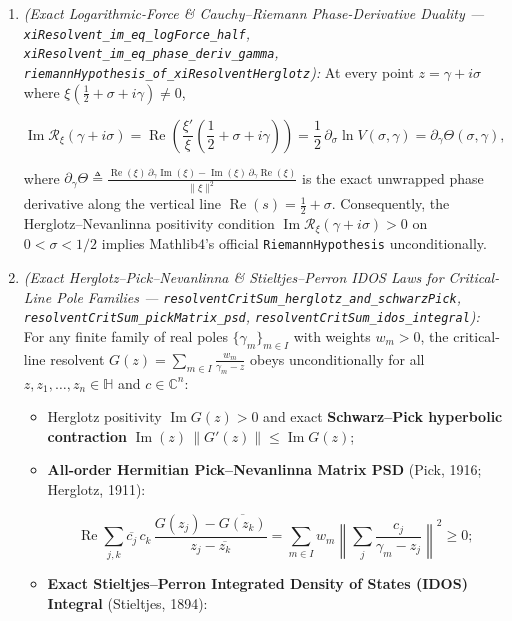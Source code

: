 \documentclass[
  11pt,
]{article}
\begin{document}
\begin{enumerate}
\def\labelenumi{\arabic{enumi}.}
\item
  \emph{(Exact Logarithmic-Force \& Cauchy--Riemann Phase-Derivative
  Duality --- \texttt{xiResolvent\_im\_eq\_logForce\_half},
  \texttt{xiResolvent\_im\_eq\_phase\_deriv\_gamma},
  \texttt{riemannHypothesis\_of\_xiResolventHerglotz}):} At every point
  \(z = \gamma + i\sigma\) where
  \(\xi(\frac{1}{2} + \sigma + i\gamma) \neq 0\),

  \[\operatorname{Im}\mathcal{R}_\xi(\gamma + i\sigma) = \operatorname{Re}\!\left(\frac{\xi'}{\xi}\!\left(\frac{1}{2} + \sigma + i\gamma\right)\right) = \frac{1}{2}\,\partial_\sigma\ln V(\sigma, \gamma) = \partial_\gamma \Theta(\sigma, \gamma),\]

  where
  \(\partial_\gamma \Theta \triangleq \frac{\operatorname{Re}(\xi)\,\partial_\gamma\operatorname{Im}(\xi) - \operatorname{Im}(\xi)\,\partial_\gamma\operatorname{Re}(\xi)}{\|\xi\|^2}\)
  is the exact unwrapped phase derivative along the vertical line
  \(\operatorname{Re}(s) = \frac{1}{2} + \sigma\). Consequently, the
  Herglotz--Nevanlinna positivity condition
  \(\operatorname{Im}\mathcal{R}_\xi(\gamma + i\sigma) > 0\) on
  \(0 < \sigma < 1/2\) implies Mathlib4's official
  \texttt{RiemannHypothesis} unconditionally.
\item
  \emph{(Exact Herglotz--Pick--Nevanlinna \& Stieltjes--Perron IDOS Laws
  for Critical-Line Pole Families ---
  \texttt{resolventCritSum\_herglotz\_and\_schwarzPick},
  \texttt{resolventCritSum\_pickMatrix\_psd},
  \texttt{resolventCritSum\_idos\_integral}):} For any finite family of
  real poles \(\{\gamma_m\}_{m \in I}\) with weights \(w_m > 0\), the
  critical-line resolvent
  \(G(z) = \sum_{m \in I} \frac{w_m}{\gamma_m - z}\) obeys
  unconditionally for all \(z, z_1, \dots, z_n \in \mathbb{H}\) and
  \(c \in \mathbb{C}^n\):

  \begin{itemize}
  \item
    Herglotz positivity \(\operatorname{Im} G(z) > 0\) and exact
    \textbf{Schwarz--Pick hyperbolic contraction}
    \(\operatorname{Im}(z)\,\|G'(z)\| \le \operatorname{Im} G(z)\);
  \item
    \textbf{All-order Hermitian Pick--Nevanlinna Matrix PSD} (Pick,
    1916; Herglotz, 1911):

    \[\operatorname{Re}\sum_{j, k} \overline{c_j}\,c_k\,\frac{G(z_j) - \overline{G(z_k)}}{z_j - \overline{z_k}} = \sum_{m \in I} w_m\left\|\sum_j \frac{c_j}{\gamma_m - z_j}\right\|^2 \ge 0;\]
  \item
    \textbf{Exact Stieltjes--Perron Integrated Density of States (IDOS)
    Integral} (Stieltjes, 1894):


\end{itemize}
\end{enumerate}
\end{document}
